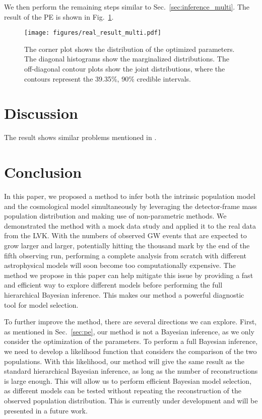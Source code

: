 \documentclass[sn-aps, pdflatex]{sn-jnl}
\begin{document}
We then perform the remaining steps similar to Sec.~\ref{sec:inference_multi}.
The result of the \ac{PE} is shown in Fig.~\ref{fig:real_result_multi}.
\begin{figure}[htbp]
    \texttt{[image: figures/real\_result\_multi.pdf]}
    \caption{
        The corner plot shows the distribution of the optimized parameters.
        The diagonal histograms show the marginalized distributions.
        The off-diagonal contour plots show the joint distributions, where the contours represent the 39.35\%, 90\% credible intervals.
    }
    \label{fig:real_result_multi}
\end{figure}

\section{Discussion}
\label{sec:discussion}

The result shows similar problems mentioned in \cite{Pierra:2023deu}.

\section{Conclusion}
\label{sec:conclusion}

In this paper, we proposed a method to infer both the intrinsic population model and the cosmological model simultaneously by leveraging the detector-frame mass population distribution and making use of non-parametric methods.
We demonstrated the method with a mock data study and applied it to the real data from the \ac{LVK}.
With the numbers of observed \ac{GW} events that are expected to grow larger and larger, potentially hitting the thousand mark by the end of the fifth observing run, performing a complete analysis from scratch with different astrophysical models will soon become too computationally expensive.
The method we propose in this paper can help mitigate this issue by providing a fast and efficient way to explore different models before performing the full hierarchical Bayesian inference.
This makes our method a powerful diagnostic tool for model selection.

To further improve the method, there are several directions we can explore.
First, as mentioned in Sec.~\ref{sec:pe}, our method is not a Bayesian inference, as we only consider the optimization of the parameters.
To perform a full Bayesian inference, we need to develop a likelihood function that considers the comparison of the two populations.
With this likelihood, our method will give the same result as the standard hierarchical Bayesian inference, as long as the number of reconstructions is large enough.
This will allow us to perform efficient Bayesian model selection, as different models can be tested without repeating the reconstruction of the observed population distribution.
This is currently under development and will be presented in a future work.
\end{document}

